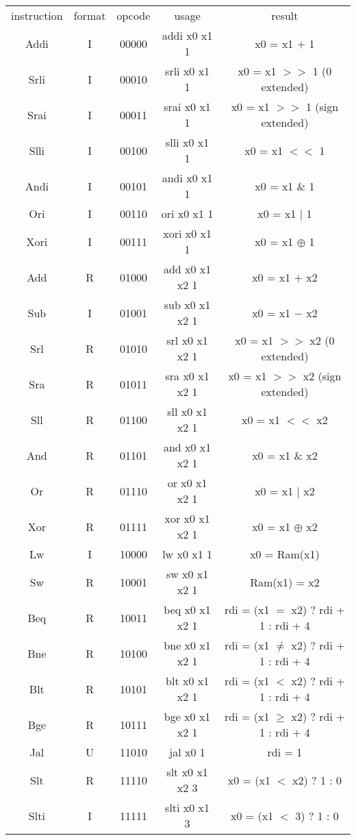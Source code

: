 \documentclass{article}
\begin{document}
\begin{center}
	\def\arraystretch{2.2}
	\begin{tabular}{c|c|c|c|c}
		instruction & format & opcode & usage & result\\
		\cline{1-5}
		Addi & I & 00000 & addi x0 x1 1 & x0 = x1 $+$ 1 \\
		Srli & I & 00010 & srli x0 x1 1 & x0 = x1 $>>$ 1 (0 extended)\\
		Srai & I & 00011 & srai x0 x1 1 & x0 = x1 $>>$ 1 (sign extended)\\
		Slli & I & 00100 & slli x0 x1 1 & x0 = x1 $<<$ 1 \\
		Andi & I & 00101 & andi x0 x1 1 & x0 = x1 \& 1 \\
		Ori & I & 00110 & ori x0 x1 1 & x0 = x1 $|$ 1 \\
		Xori & I & 00111 & xori x0 x1 1 & x0 = x1 $\oplus$ 1 \\
		Add & R & 01000 & add x0 x1 x2 1& x0 = x1 $+$ x2 \\
		Sub & I & 01001 & sub x0 x1 x2 1& x0 = x1 $-$ x2 \\
		Srl & R & 01010 & srl x0 x1 x2 1& x0 = x1 $>>$ x2 (0 extended)\\
		Sra & R & 01011 & sra x0 x1 x2 1& x0 = x1 $>>$ x2 (sign extended)\\
		Sll & R & 01100 & sll x0 x1 x2 1& x0 = x1 $<<$ x2 \\
		And & R & 01101 & and x0 x1 x2 1& x0 = x1 \& x2 \\
		Or & R & 01110 & or x0 x1 x2 1& x0 = x1 $|$ x2 \\
		Xor & R & 01111 & xor x0 x1 x2 1& x0 = x1 $\oplus$ x2 \\
		Lw & I & 10000 & lw x0 x1 1 & x0 = Ram(x1)\\
		Sw & R & 10001 & sw x0 x1 x2 1& Ram(x1) = x2\\
		Beq & R & 10011 & beq x0 x1 x2 1& rdi = (x1 $=$ x2) ? rdi + 1 : rdi + 4\\
		Bne & R & 10100 & bne x0 x1 x2 1& rdi = (x1 $\neq$ x2) ? rdi + 1 : rdi + 4\\
		Blt & R & 10101 & blt x0 x1 x2 1& rdi = (x1 $<$ x2) ? rdi + 1 : rdi + 4\\
		Bge & R & 10111 & bge x0 x1 x2 1& rdi = (x1 $\geq$ x2) ? rdi + 1 : rdi + 4\\
		Jal & U & 11010 & jal x0 1 & rdi = 1\\
		Slt & R & 11110 & slt x0 x1 x2 3 & x0 = (x1 $<$ x2) ? 1 : 0 \\
		Slti & I & 11111 & slti x0 x1 3 & x0 = (x1 $<$ 3) ? 1 : 0 \\
	\end{tabular}
\end{center} 
\end{document}

